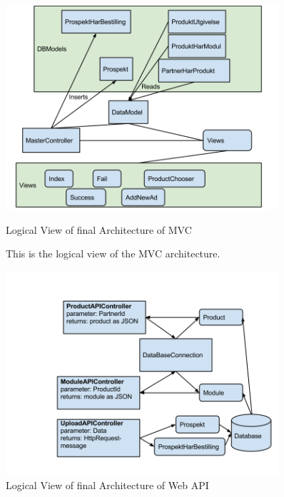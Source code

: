 \begin{center}
\begin{figure}[H]
\centering
\includegraphics[width=0.9\textwidth]{images/architecture_final02.png}
\caption{Logical View of final Architecture of MVC}
\caption*{This is the logical view of the MVC architecture.}
\label{fig:logical_view1}
\end{figure}
\end{center}


\begin{center}
\begin{figure}[H]
\centering
\includegraphics[width=0.9\textwidth]{images/architecture_finalwebapi01.png}
\caption{Logical View of final Architecture of Web API}
\label{fig:process_view_webapi}
\end{figure}
\end{center}


